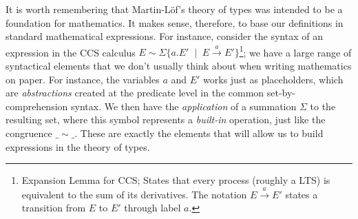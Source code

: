 It is worth remembering that Martin-L\"{o}f's theory of types was intended to be a foundation
for mathematics. It makes sense, therefore, to base our definitions in standard mathematical expressions.
For instance, consider the syntax of an expression in the CCS calculus \cite{Milner80} $E \sim \Sigma \{ a.E' \;\mid\; E \xrightarrow{\;a\;} E' \}$\footnote{%
Expansion Lemma for CCS; States that every process (roughly a LTS) is equivalent to the sum of its derivatives.
The notation $E \xrightarrow{\;a\;} E'$ states a transition from $E$ to $E'$ through label $a$.
}; we have a large range of syntactical elements that we don't usually think about when writing
mathematics on paper. For instance, the variables $a$ and $E'$ works just as placeholders, which
are \emph{abstractions} created at the predicate level in the common set-by-comprehension syntax. We then
have the \emph{application} of a summation $\Sigma$ to the resulting set, where this symbol represents
a \emph{built-in} operation, just like the congruence $\_\sim\_$. These are exactly the elements
that will allow us to build expressions in the theory of types.\\

